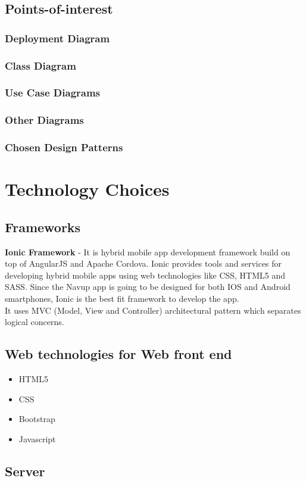 \documentclass{article}
\begin{document}
    \subsection{Points-of-interest}
        \subsubsection{Deployment Diagram}
        \subsubsection{Class Diagram}
        \subsubsection{Use Case Diagrams}
        \subsubsection{Other Diagrams}
        \subsubsection{Chosen Design Patterns}
\section{Technology Choices}
\subsection{Frameworks}
	\textbf{Ionic Framework} - It is hybrid mobile app development framework build on top of AngularJS and Apache Cordova. Ionic provides tools and services for developing hybrid mobile apps using web technologies like CSS, HTML5 and SASS. Since the Navup app is going to be designed for both IOS and Android smartphones, Ionic is the best fit framework to develop the app. \\
	It uses MVC (Model, View and Controller) architectural pattern which separates logical concerns.
	
	\subsection{Web technologies for Web front end}
	\begin{itemize}
	\item HTML5
	\item CSS
	\item Bootstrap
	\item Javascript
\end{itemize}
\subsection{Server}
\end{document}
